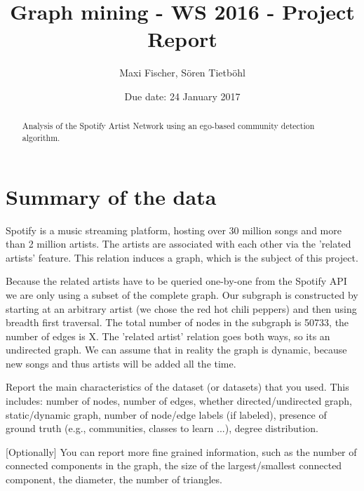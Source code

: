 \documentclass[11pt,a4paper,onecolumn,notitlepage]{article}
\begin{document}
\title{Graph mining - WS 2016 - Project Report}




\date{Due date: 24 January 2017}

\author{
Maxi Fischer, S\"oren Tietb\"ohl\\ 
}


\maketitle



\begin{abstract}
Analysis of the Spotify Artist Network using an ego-based community detection algorithm.
\end{abstract}


\section{Summary of the data}

Spotify is a music streaming platform, hosting over 30 million songs and more than 2 million artists. The artists are associated with each other via the 'related artists' feature. This relation induces a graph, which is the subject of this project.

Because the related artists have to be queried one-by-one from the Spotify API we are only using a subset of the complete graph. Our subgraph is constructed by starting at an arbitrary artist (we chose the red hot chili peppers) and then using breadth first traversal. The total number of nodes in the subgraph is 50733, the number of edges is X. The 'related artist' relation goes both ways, so its an undirected graph.
We can assume that in reality the graph is dynamic, because new songs and thus artists will be added all the time.

Report the main characteristics of the dataset (or datasets) that you used. This includes: number of nodes, number of edges, whether directed/undirected graph, static/dynamic graph, number of node/edge labels (if labeled), presence of ground truth (e.g., communities, classes to learn ...), degree distribution.

[Optionally] You can report more fine grained information, such as the number of connected components in the graph, the size of the largest/smallest connected component, the diameter, the number of triangles.
\end{document}
